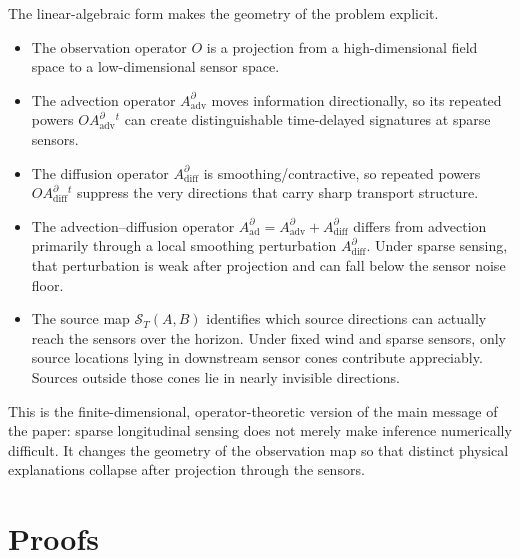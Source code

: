The linear-algebraic form makes the geometry of the problem explicit.

\begin{itemize}[itemsep=0pt,topsep=0pt,leftmargin=*]
    \item The observation operator $O$ is a projection from a high-dimensional field space to a low-dimensional sensor space.
    \item The advection operator $A_{\mathrm{adv}}^{\partial}$ moves information directionally, so its repeated powers $OA_{\mathrm{adv}}^{\partial}^t$ can create distinguishable time-delayed signatures at sparse sensors.
    \item The diffusion operator $A_{\mathrm{diff}}^{\partial}$ is smoothing/contractive, so repeated powers $OA_{\mathrm{diff}}^{\partial}^t$ suppress the very directions that carry sharp transport structure.
    \item The advection--diffusion operator $A_{\mathrm{ad}}^{\partial} = A_{\mathrm{adv}}^{\partial} + A_{\mathrm{diff}}^{\partial}$ differs from advection primarily through a local smoothing perturbation $A_{\mathrm{diff}}^{\partial}$. Under sparse sensing, that perturbation is weak after projection and can fall below the sensor noise floor.
    \item The source map $\mathcal{S}_T(A,B)$ identifies which source directions can actually reach the sensors over the horizon. Under fixed wind and sparse sensors, only source locations lying in downstream sensor cones contribute appreciably. Sources outside those cones lie in nearly invisible directions.
\end{itemize}

This is the finite-dimensional, operator-theoretic version of the main message of the paper: sparse longitudinal sensing does not merely make inference numerically difficult. It changes the geometry of the observation map so that distinct physical explanations collapse after projection through the sensors.





\section{Proofs}
